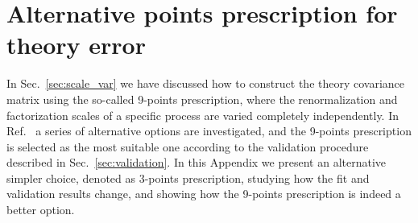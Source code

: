 \chapter{Alternative points prescription for theory error}
\label{app:the_error_3pt}
In Sec.~\ref{sec:scale_var} we have discussed how to construct the theory covariance matrix using the so-called 9-points prescription, 
where the renormalization and factorization scales of a specific process are varied completely independently.
In Ref.~\cite{AbdulKhalek:2019ihb} a series of alternative options are investigated, and the 9-points prescription is selected 
as the most suitable one according to the validation procedure described in Sec.~\ref{sec:validation}.
In this Appendix we present an alternative simpler choice, denoted as 3-points prescription,
studying how the fit and validation results change, and showing how the 9-points prescription is indeed a better option. 

